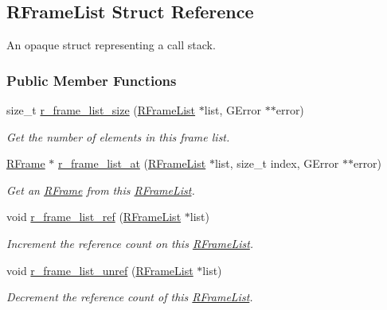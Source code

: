 \hypertarget{struct_r_frame_list}{\subsection{R\-Frame\-List Struct Reference}
\label{struct_r_frame_list}
}


An opaque struct representing a call stack.  


\subsubsection*{Public Member Functions}
\begin{DoxyCompactItemize}
\item 
size\-\_\-t \hyperlink{struct_r_frame_list_a9058fdf39e9738a3adf2379e767b3d20}{r\-\_\-frame\-\_\-list\-\_\-size} (\hyperlink{struct_r_frame_list}{R\-Frame\-List} $\ast$list, G\-Error $\ast$$\ast$error)
\begin{DoxyCompactList}\small\item\em Get the number of elements in this frame list. \end{DoxyCompactList}\item 
\hyperlink{struct_r_frame}{R\-Frame} $\ast$ \hyperlink{struct_r_frame_list_ad39dc50f681a5576da3fb1d7b08398bd}{r\-\_\-frame\-\_\-list\-\_\-at} (\hyperlink{struct_r_frame_list}{R\-Frame\-List} $\ast$list, size\-\_\-t index, G\-Error $\ast$$\ast$error)
\begin{DoxyCompactList}\small\item\em Get an \hyperlink{struct_r_frame}{R\-Frame} from this \hyperlink{struct_r_frame_list}{R\-Frame\-List}. \end{DoxyCompactList}\item 
void \hyperlink{struct_r_frame_list_a7ed414a8b2cd92778f91e391bb9db882}{r\-\_\-frame\-\_\-list\-\_\-ref} (\hyperlink{struct_r_frame_list}{R\-Frame\-List} $\ast$list)
\begin{DoxyCompactList}\small\item\em Increment the reference count on this \hyperlink{struct_r_frame_list}{R\-Frame\-List}. \end{DoxyCompactList}\item 
void \hyperlink{struct_r_frame_list_ab2f57f2088ab983a15cfae4dd59fa80d}{r\-\_\-frame\-\_\-list\-\_\-unref} (\hyperlink{struct_r_frame_list}{R\-Frame\-List} $\ast$list)
\begin{DoxyCompactList}\small\item\em Decrement the reference count of this \hyperlink{struct_r_frame_list}{R\-Frame\-List}. \end{DoxyCompactList}\end{DoxyCompactItemize}


